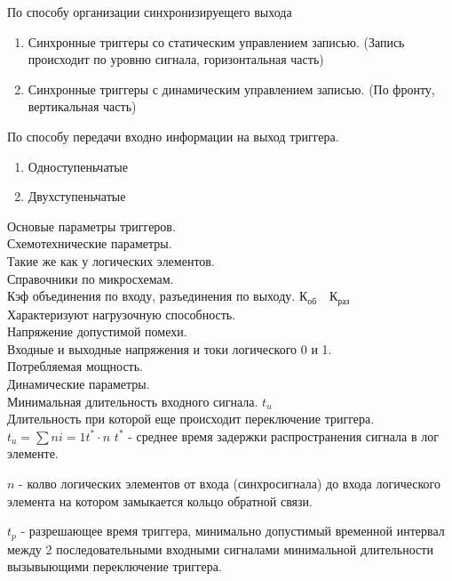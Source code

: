 По способу организации синхронизируещего выхода\\

\begin{enumerate}
  \item Синхронные триггеры со статическим управлением записью. (Запись происходит по уровню сигнала, горизонтальная часть)
  \item Синхронные триггеры с динамическим управлением записью. (По фронту, вертикальная часть)
\end{enumerate}

По способу передачи входно информации на выход триггера.\\
\begin{enumerate}
  \item Одноступеньчатые
  \item Двухступеньчатые
\end{enumerate}

Основые параметры триггеров.\\
Схемотехнические параметры.\\

Такие же как у логических элементов.\\
Справочники по микросхемам.\\

Кэф объединения по входу, разъединения по выходу. $К_{об}  \quad К_{раз}$\\
Характеризуют нагрузочную способность.\\


Напряжение допустимой помехи. \\
Входные и выходные напряжения и токи логического 0 и 1. \\

Потребляемая мощность.\\


Динамические параметры.\\

Минимальная длительность входного сигнала. $t_u$ \\
Длительность при которой еще происходит переключение триггера.\\
$ t_u = \sum{n}{i = 1} t^* \cdot n  $
$t^*$ - среднее время задержки распространения сигнала  в лог элементе.

$n$ - колво логических элементов от входа  (синхросигнала) до входа логического элемента на котором замыкается кольцо обратной связи.

$t_p$ - разрешающее время триггера, минимально допустимый временной интервал между 2 последовательными входными сигналами
 минимальной длительности вызывыющими переключение триггера.

